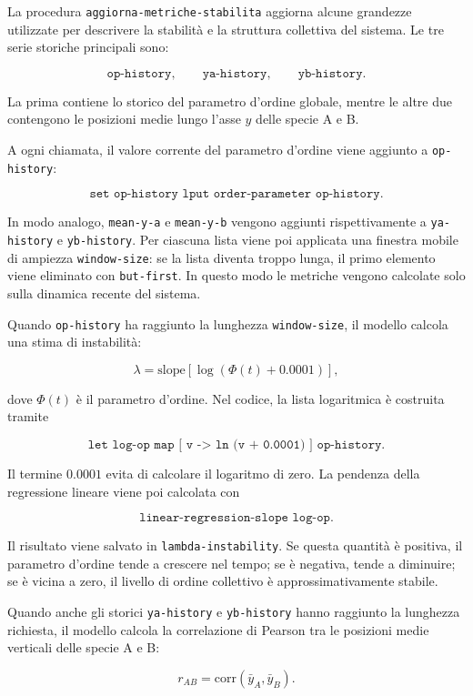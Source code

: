 La procedura \texttt{aggiorna-metriche-stabilita} aggiorna alcune grandezze
utilizzate per descrivere la stabilità e la struttura collettiva del sistema.
Le tre serie storiche principali sono:

\[
\texttt{op-history},
\qquad
\texttt{ya-history},
\qquad
\texttt{yb-history}.
\]

La prima contiene lo storico del parametro d'ordine globale, mentre le altre due
contengono le posizioni medie lungo l'asse \(y\) delle specie A e B.

A ogni chiamata, il valore corrente del parametro d'ordine viene aggiunto a
\texttt{op-history}:

\[
\texttt{set op-history lput order-parameter op-history}.
\]

In modo analogo, \texttt{mean-y-a} e \texttt{mean-y-b} vengono aggiunti
rispettivamente a \texttt{ya-history} e \texttt{yb-history}. Per ciascuna lista
viene poi applicata una finestra mobile di ampiezza \texttt{window-size}: se la
lista diventa troppo lunga, il primo elemento viene eliminato con
\texttt{but-first}. In questo modo le metriche vengono calcolate solo sulla
dinamica recente del sistema.

Quando \texttt{op-history} ha raggiunto la lunghezza \texttt{window-size}, il
modello calcola una stima di instabilità:

\[
\lambda =
\text{slope}
\left[
\log(\Phi(t)+0.0001)
\right],
\]

dove \(\Phi(t)\) è il parametro d'ordine. Nel codice, la lista logaritmica è
costruita tramite

\[
\texttt{let log-op map [ v -> ln (v + 0.0001) ] op-history}.
\]

Il termine \(0.0001\) evita di calcolare il logaritmo di zero. La pendenza della
regressione lineare viene poi calcolata con

\[
\texttt{linear-regression-slope log-op}.
\]

Il risultato viene salvato in \texttt{lambda-instability}. Se questa quantità è
positiva, il parametro d'ordine tende a crescere nel tempo; se è negativa, tende
a diminuire; se è vicina a zero, il livello di ordine collettivo è
approssimativamente stabile.

Quando anche gli storici \texttt{ya-history} e \texttt{yb-history} hanno
raggiunto la lunghezza richiesta, il modello calcola la correlazione di Pearson
tra le posizioni medie verticali delle specie A e B:

\[
r_{AB}
=
\mathrm{corr}
\left(
\bar{y}_A,
\bar{y}_B
\right).
\]

